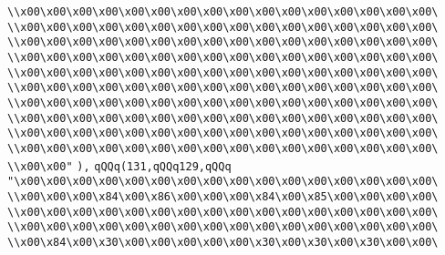 \verb|\\x00\x00\x00\x00\x00\x00\x00\x00\x00\x00\x00\x00\x00\x00\x00\x00\|\newline
\verb|\\x00\x00\x00\x00\x00\x00\x00\x00\x00\x00\x00\x00\x00\x00\x00\x00\|\newline
\verb|\\x00\x00\x00\x00\x00\x00\x00\x00\x00\x00\x00\x00\x00\x00\x00\x00\|\newline
\verb|\\x00\x00\x00\x00\x00\x00\x00\x00\x00\x00\x00\x00\x00\x00\x00\x00\|\newline
\verb|\\x00\x00\x00\x00\x00\x00\x00\x00\x00\x00\x00\x00\x00\x00\x00\x00\|\newline
\verb|\\x00\x00\x00\x00\x00\x00\x00\x00\x00\x00\x00\x00\x00\x00\x00\x00\|\newline
\verb|\\x00\x00\x00\x00\x00\x00\x00\x00\x00\x00\x00\x00\x00\x00\x00\x00\|\newline
\verb|\\x00\x00\x00\x00\x00\x00\x00\x00\x00\x00\x00\x00\x00\x00\x00\x00\|\newline
\verb|\\x00\x00\x00\x00\x00\x00\x00\x00\x00\x00\x00\x00\x00\x00\x00\x00\|\newline
\verb|\\x00\x00\x00\x00\x00\x00\x00\x00\x00\x00\x00\x00\x00\x00\x00\x00\|\newline
\verb|\\x00\x00"|\newline
\verb|),|\newline
\verb|qQQq(131,qQQq129,qQQq|\newline
\verb|"\x00\x00\x00\x00\x00\x00\x00\x00\x00\x00\x00\x00\x00\x00\x00\x00\|\newline
\verb|\\x00\x00\x00\x84\x00\x86\x00\x00\x00\x84\x00\x85\x00\x00\x00\x00\|\newline
\verb|\\x00\x00\x00\x00\x00\x00\x00\x00\x00\x00\x00\x00\x00\x00\x00\x00\|\newline
\verb|\\x00\x00\x00\x00\x00\x00\x00\x00\x00\x00\x00\x00\x00\x00\x00\x00\|\newline
\verb|\\x00\x84\x00\x30\x00\x00\x00\x00\x00\x30\x00\x30\x00\x30\x00\x00\|\newline

